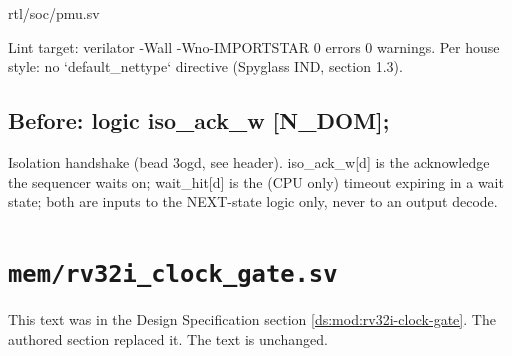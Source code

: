\begin{relocated}{rtl/soc/pmu.sv}
\begin{textblock}
Lint target: verilator -Wall -Wno-IMPORTSTAR 0 errors 0 warnings.
Per house style: no `default_nettype` directive (Spyglass IND, section 1.3).
\end{textblock}

\subsection*{Before: logic iso\_ack\_w [N\_DOM];}

\begin{textblock}
Isolation handshake (bead 3ogd, see header). iso_ack_w[d] is the acknowledge the sequencer
waits on; wait_hit[d] is the (CPU only) timeout expiring in a wait state; both are inputs
to the NEXT-state logic only, never to an output decode.
\end{textblock}

\end{relocated}

\section{\texttt{mem/rv32i\_clock\_gate.sv}}\label{cr:arc:ds-rv32i-clock-gate}

This text was in the Design Specification section \cref{ds:mod:rv32i-clock-gate}. The authored section replaced it. The text is unchanged.

